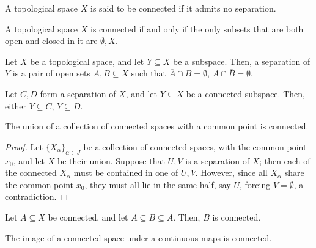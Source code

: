 \documentclass[11pt]{article}
\theoremstyle{definition}
\theoremstyle{remark}
\numberwithin{equation}{section}
\begin{document}
    \begin{definition}
        A topological space $X$ is said to be connected if it admits no separation.
    \end{definition}

    \begin{lemma}
        A topological space $X$ is connected if and only if the only subsets that are
        both open and closed in it are $\emptyset, X$.
    \end{lemma}

    \begin{lemma}
        Let $X$ be a topological space, and let $Y \subseteq X$ be a subspace. Then,
        a separation of $Y$ is a pair of open sets $A, B \subseteq X$ such that
        $\overline{A} \cap B = \emptyset$, $A \cap \overline{B} = \emptyset$.
    \end{lemma}

    \begin{lemma}
        Let $C, D$ form a separation of $X$, and let $Y \subseteq X$ be a connected
        subspace. Then, either $Y \subseteq C$, $Y \subseteq D$.
    \end{lemma}

    \begin{lemma}
        The union of a collection of connected spaces with a common point is
        connected.
    \end{lemma}
    \begin{proof}
        Let $\{X_\alpha\}_{\alpha \in J}$ be a collection of connected spaces, with
        the common point $x_0$, and let $X$ be their union. Suppose that $U, V$ is a
        separation of $X$; then each of the connected $X_\alpha$ must be contained in
        one of $U, V$. However, since all $X_\alpha$ share the common point $x_0$,
        they must all lie in the same half, say $U$, forcing $V = \emptyset$, a
        contradiction.
    \end{proof}
    

    \begin{lemma}
        Let $A \subseteq X$ be connected, and let $A \subseteq B \subseteq
        \overline{A}$. Then, $B$ is connected.
    \end{lemma}


    \begin{theorem}
        The image of a connected space under a continuous maps is connected.
    \end{theorem}
\end{document}
